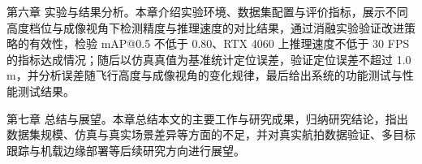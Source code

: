 第六章 实验与结果分析。本章介绍实验环境、数据集配置与评价指标，展示不同高度档位与成像视角下检测精度与推理速度的对比结果，通过消融实验验证改进策略的有效性，检验 mAP@0.5 不低于 0.80、RTX 4060 上推理速度不低于 30 FPS 的指标达成情况；随后以仿真真值为基准统计定位误差，验证定位误差不超过 1.0 m，并分析误差随飞行高度与成像视角的变化规律，最后给出系统的功能测试与性能测试结果。

第七章 总结与展望。本章总结本文的主要工作与研究成果，归纳研究结论，指出数据集规模、仿真与真实场景差异等方面的不足，并对真实航拍数据验证、多目标跟踪与机载边缘部署等后续研究方向进行展望。



